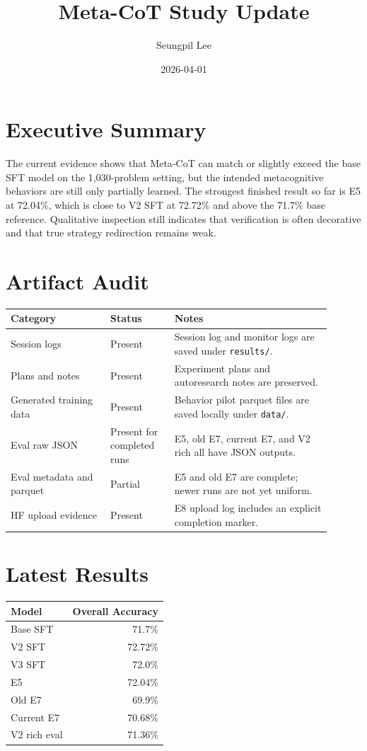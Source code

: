 \documentclass[11pt]{article}
\title{Meta-CoT Study Update}
\author{Seungpil Lee}
\date{2026-04-01}
\begin{document}
\maketitle

\section*{Executive Summary}
The current evidence shows that Meta-CoT can match or slightly exceed the base SFT model on the 1,030-problem setting, but the intended metacognitive behaviors are still only partially learned. The strongest finished result so far is E5 at 72.04\%, which is close to V2 SFT at 72.72\% and above the 71.7\% base reference. Qualitative inspection still indicates that verification is often decorative and that true strategy redirection remains weak.

\section*{Artifact Audit}
\begin{longtable}{p{0.28\linewidth} p{0.18\linewidth} p{0.44\linewidth}}
\toprule
Category & Status & Notes \\
\midrule
Session logs & Present & Session log and monitor logs are saved under \texttt{results/}. \\
Plans and notes & Present & Experiment plans and autoresearch notes are preserved. \\
Generated training data & Present & Behavior pilot parquet files are saved locally under \texttt{data/}. \\
Eval raw JSON & Present for completed runs & E5, old E7, current E7, and V2 rich all have JSON outputs. \\
Eval metadata and parquet & Partial & E5 and old E7 are complete; newer runs are not yet uniform. \\
HF upload evidence & Present & E8 upload log includes an explicit completion marker. \\
\bottomrule
\end{longtable}

\section*{Latest Results}
\begin{tabular}{lr}
\toprule
Model & Overall Accuracy \\
\midrule
Base SFT & 71.7\% \\
V2 SFT & 72.72\% \\
V3 SFT & 72.0\% \\
E5 & 72.04\% \\
Old E7 & 69.9\% \\
Current E7 & 70.68\% \\
V2 rich eval & 71.36\% \\
\bottomrule
\end{tabular}
\end{document}
